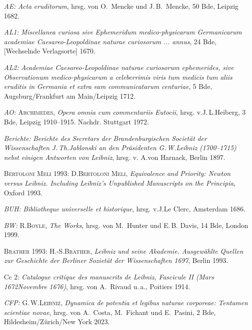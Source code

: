 \begingroup		%
\setlength{\leftskip}{10mm}%
\setlength{\parindent}{-\leftskip}
\hspace*{-10mm}%
\textit{AE:} \textit{Acta eruditorum}, hrsg. von O.~Mencke und J.\,B.~Mencke, 50 Bde, Leipzig 1682.\par
\textit{AL1:} \textit{Miscellanea curiosa sive Ephemeridum medico-physicarum Germanicarum academiae Caesareo-Leopoldinae naturae curiosorum ... annus}, 24 Bde, [Wechselnde Verlagsorte] 1670.\par
\textit{AL2:} \textit{Academiae Caesareo-Leopoldinae naturae curiosorum ephemerides, sive Observationum medico-physicarum a celeberrimis viris tum medicis tum aliis eruditis in Germania et extra eam communicatarum centuriae}, 5 Bde, Augsburg/Frankfurt am Main/Leipzig 1712.\par
\textit{AO:} \textsc{Archimedes}, \textit{Opera omnia cum commentariis Eutocii}, hrsg. v.\;J.\,L.\;Heiberg, 3 Bde, Leipzig 1910--1915. Nachdr. Stuttgart 1972.\par
\textit{Berichte:} \textit{Berichte des Secretars der Brandenburgischen Societät der Wissenschaften J.\,Th.\;Jablonski an den Präsidenten G.\,W.\;Leibniz (1700--1715) nebst einigen Antworten von Leibniz}, hrsg. v. A.\;von Harnack, Berlin 1897.\par
\textsc{Bertoloni Meli} 1993: D.\;\textsc{Bertoloni Meli}, \textit{Equivalence and Priority: Newton versus Leibniz. Including Leibniz's Unpublished Manuscripts on the Principia}, Oxford 1993.\par
\textit{BUH:} \textit{Bibliotheque universelle et historique}, hrsg. v.\;J.\;Le Clerc, Amsterdam 1686.\par
\textit{BW:} R.\;\textsc{Boyle}, \textit{The Works}, hrsg. von M.~Hunter und E.\,B. Davis, 14 Bde, London 1999.\par
\textsc{Brather} 1993: H.-S.\;\textsc{Brather}, \textit{Leibniz und seine Akademie. Ausgewählte Quellen zur Geschichte der Berliner Sozietät der Wissenschaften 1697}, Berlin 1993.\par
Cc 2: \textit{Catalogue critique des manuscrits de Leibniz, Fascicule II (Mars 1672\textendash Novembre 1676)}, hrsg. von A.~Rivaud u.\,a., Poitiers 1914.\par
\textit{CFP:} G.\,W.\;\textsc{Leibniz}, \textit{Dynamica de potentia et legibus naturae corporeae: Tentamen scientiae novae}, hrsg. von A.~Costa, M.~Fichant und E.~Pasini, 2 Bde, Hildesheim/Zürich/New York 2023.\par
